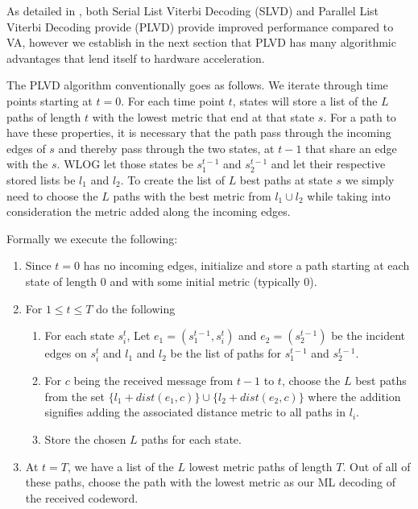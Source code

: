 As detailed in \cite{plvd}, both Serial List Viterbi Decoding (SLVD) and Parallel List Viterbi Decoding provide (PLVD) provide improved performance compared to VA, however we establish in the next section that PLVD has many algorithmic advantages that lend itself to hardware acceleration. 


The PLVD algorithm conventionally goes as follows. We iterate through time points starting at $t=0$. For each time point $t$, states will store a list of the $L$ paths of length $t$ with the lowest metric that end at that state $s$. For a path to have these properties, it is necessary that the path pass through the incoming edges of $s$ and thereby pass through the two states, at $t-1$ that share an edge with the $s$. WLOG let those states be $s^{t-1}_1$ and $s^{t-1}_2$ and let their respective stored lists be $l_1$ and $l_2$. To create the list of $L$ best paths at state $s$ we simply need to choose the $L$ paths with the best metric from $l_1 \cup l_2$ while taking into consideration the metric added along the incoming edges.

Formally we execute the following:

\begin{enumerate}
\item Since $t=0$ has no incoming edges, initialize and store a path starting at each state of length $0$ and with some initial metric (typically $0$).
\item For $1 \leq t \leq T$ do the following 
\begin{enumerate}
    \item For each state $s^t_i$, Let $e_1=(s^{t-1}_1, s^t_i)$ and $e_2=(s^{t-1}_2)$ be the incident edges on $s^t_i$ and $l_1$ and $l_2$ be the list of paths for $s^{t-1}_1$ and $s^{t-1}_2$.
    \item For $c$ being the received message from $t-1$ to $t$, choose the $L$ best paths from the set $\{l_1 + dist(e_1, c)\} \cup \{l_2 + dist(e_2, c)\}$ where the addition signifies adding the associated distance metric to all paths in $l_i$. 
    \item Store the chosen $L$ paths for each state.
\end{enumerate}
\item At $t = T$, we have a list of the $L$ lowest metric paths of length $T$. Out of all of these paths, choose the path with the lowest metric as our ML decoding of the received codeword.

\end{enumerate}

